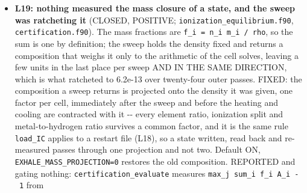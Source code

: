 \documentclass[english,a4paper]{my_memo}
\begin{document}
\begin{itemize}
  \texttt{.L14/x003\_HeH2.13} now re-reads at mass 3.764e-08 (cell 7), momentum
  1.814e-14 (cell 1), energy 8.255e-07 (cell 7) -\/- the rows it was written at
  -\/- and exits 0 where it exited 2; \textbf{all 120 certified states of
  \texttt{LHS1140b/models/} re-certify (exit 0)}, five of the seven ladder states
  reproduce their in-run row to every printed digit and two of the three the
  control refused now certify. NOT reproducible bitwise, and it cannot be: one
  ulp of the density moves the cellwise maximum of the energy row by 11
  percent, so the mass row comes back within 0.78 to 1.71 of its in-run value
  (median 1.12) and the energy row within 0.89 to 1.93 (median 1.22), and the
  restart contract now SAYS so with those numbers
  (\texttt{restart\_contract\_design\_20260909.md} section 6, \texttt{write\_reproduce.py});
  \texttt{.L14/x003\_HeH9.7}, certified at 0.87 of its tolerance, re-reads at 1.18 and
  stays refused on that ground. Codex review applied: which half of the file
  states the density is decided by the loader\textquotesingle s own INTENT -\/- each block that
  changes the composition says so -\/- and no longer by the SIZE of the
  disagreement, a restart of the same equations being allowed only rounding
  (1e-10 reported, above 1e-8 REFUSED as a damaged or mismatched pair). Opened
  by it: L19 and L20.
\item
  \textbf{L19: nothing measured the mass closure of a state, and the sweep was
  ratcheting it} (CLOSED, POSITIVE; \texttt{ionization\_equilibrium.f90},
  \texttt{certification.f90}). The mass fractions are \texttt{f\_i\ =\ n\_i\ m\_i\ /\ rho}, so the
  sum is one by definition; the sweep holds the density fixed and returns a
  composition that weighs it only to the arithmetic of the cell solves, leaving
  a few units in the last place per sweep AND IN THE SAME DIRECTION, which is
  what ratcheted to 6.2e-13 over twenty-four outer passes. FIXED: the
  composition a sweep returns is projected onto the density it was given, one
  factor per cell, immediately after the sweep and before the heating and
  cooling are contracted with it -\/- every element ratio, ionization split and
  metal-to-hydrogen ratio survives a common factor, and it is the same rule
  \texttt{load\_IC} applies to a restart file (L18), so a state written, read back and
  re-measured passes through one projection and not two. Default ON,
  \texttt{EXHALE\_MASS\_PROJECTION=0} restores the old composition. REPORTED and gating
  nothing: \texttt{certification\_evaluate} measures \texttt{max\_j\ \textbar{}sum\_i\ f\_i\ A\_i\ -\ 1\textbar{}} from

\end{itemize}
\end{document}

